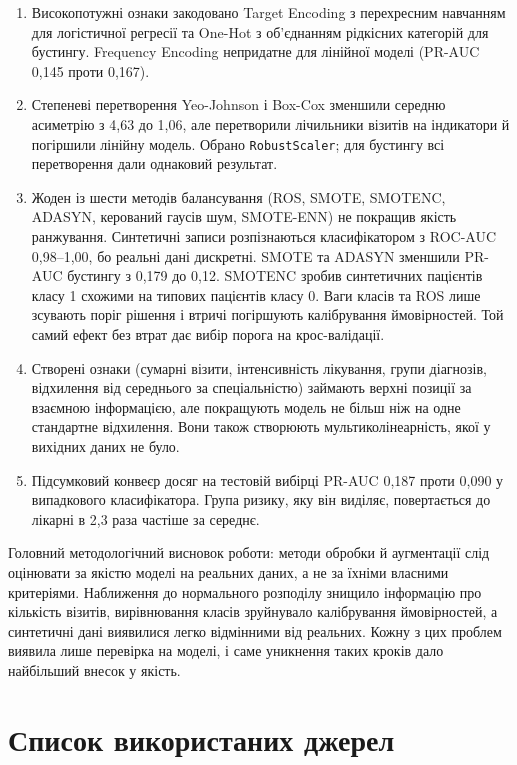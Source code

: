 \documentclass[14pt,a4paper]{extreport}
\begin{document}
\begin{enumerate}
\item Високопотужні ознаки закодовано Target Encoding з перехресним навчанням для логістичної регресії та One-Hot з об'єднанням рідкісних категорій для бустингу. Frequency Encoding непридатне для лінійної моделі (PR-AUC 0,145 проти 0,167).

\item Степеневі перетворення Yeo-Johnson і Box-Cox зменшили середню асиметрію з 4,63 до 1,06, але перетворили лічильники візитів на індикатори й погіршили лінійну модель. Обрано \texttt{RobustScaler}; для бустингу всі перетворення дали однаковий результат.

\item Жоден із шести методів балансування (ROS, SMOTE, SMOTENC, ADASYN, керований гаусів шум, SMOTE-ENN) не покращив якість ранжування. Синтетичні записи розпізнаються класифікатором з ROC-AUC 0,98--1,00, бо реальні дані дискретні. SMOTE та ADASYN зменшили PR-AUC бустингу з 0,179 до 0,12. SMOTENC зробив синтетичних пацієнтів класу 1 схожими на типових пацієнтів класу 0. Ваги класів та ROS лише зсувають поріг рішення і втричі погіршують калібрування ймовірностей. Той самий ефект без втрат дає вибір порога на крос-валідації.

\item Створені ознаки (сумарні візити, інтенсивність лікування, групи діагнозів, відхилення від середнього за спеціальністю) займають верхні позиції за взаємною інформацією, але покращують модель не більш ніж на одне стандартне відхилення. Вони також створюють мультиколінеарність, якої у вихідних даних не було.

\item Підсумковий конвеєр досяг на тестовій вибірці PR-AUC 0,187 проти 0,090 у випадкового класифікатора. Група ризику, яку він виділяє, повертається до лікарні в 2,3 раза частіше за середнє.
\end{enumerate}

Головний методологічний висновок роботи: методи обробки й аугментації слід оцінювати за якістю моделі на реальних даних, а не за їхніми власними критеріями. Наближення до нормального розподілу знищило інформацію про кількість візитів, вирівнювання класів зруйнувало калібрування ймовірностей, а синтетичні дані виявилися легко відмінними від реальних. Кожну з цих проблем виявила лише перевірка на моделі, і саме уникнення таких кроків дало найбільший внесок у якість.

\section*{Список використаних джерел}
\end{document}
